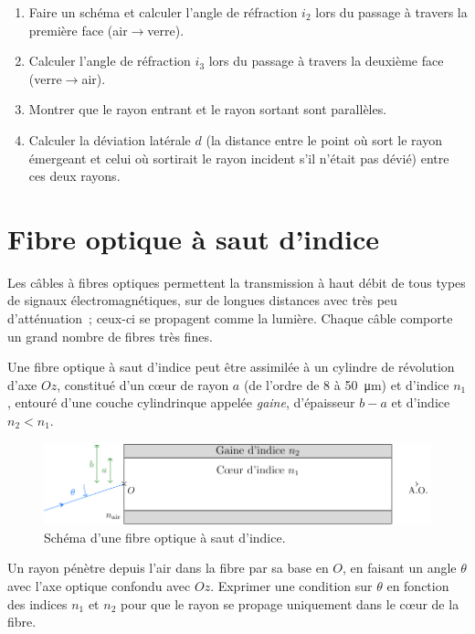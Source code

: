 \documentclass[../../main/main.tex]{subfiles}
\begin{document}
\begin{enumerate}
	\item Faire un schéma et calculer l'angle de réfraction $i_2$ lors du
	      passage à travers la première face (air$\rightarrow$verre).
	\item Calculer l'angle de réfraction $i_3$ lors du passage à travers la
	      deuxième face (verre$\rightarrow$air).
	\item Montrer que le rayon entrant et le rayon sortant sont parallèles.
	\item Calculer la déviation latérale $d$ (la distance entre le point où sort
	      le rayon émergeant et celui où sortirait le rayon incident s'il n'était
	      pas dévié) entre ces deux rayons.
\end{enumerate}

\section{Fibre optique à saut d'indice}

Les câbles à fibres optiques permettent la transmission à haut débit de tous
types de signaux électromagnétiques, sur de longues distances avec très peu
d'atténuation~; ceux-ci se propagent comme la lumière. Chaque câble comporte un
grand nombre de fibres très fines.

Une fibre optique à saut d'indice peut être assimilée à un cylindre de
révolution d'axe $Oz$, constitué d'un cœur de rayon $a$ (de l'ordre de 8 à
\SI{50}{\micro m}) et d'indice $n_1$, entouré d'une couche cylindrinque appelée
\textit{gaine}, d'épaisseur $b-a$ et d'indice $n_2 < n_1$.

\begin{figure}[h]
	\centering
	\includegraphics[width=.8\linewidth]{fibre_plain.pdf}
	\captionsetup{justification=centering}
	\caption{Schéma d'une fibre optique à saut d'indice.}
	\label{fig:fibre_plain}
\end{figure}

Un rayon pénètre depuis l'air dans la fibre par sa base en $O$, en faisant un
angle $\theta$ avec l'axe optique confondu avec $Oz$. Exprimer une condition sur
$\theta$ en fonction des indices $n_1$ et $n_2$ pour que le rayon se propage
uniquement dans le cœur de la fibre.
\end{document}
